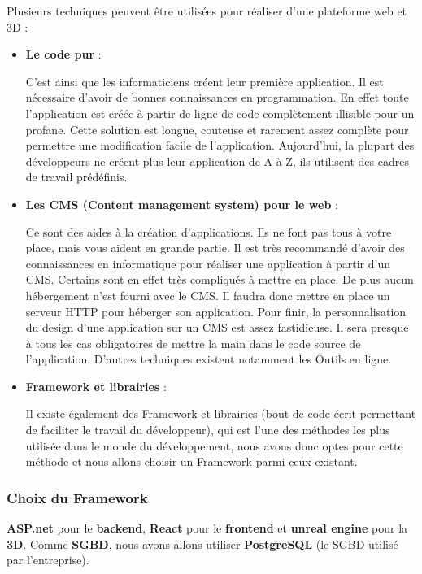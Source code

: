 Plusieurs techniques peuvent être utilisées pour réaliser d’une plateforme web et 3D :

\begin{itemize}
	\item \textbf{Le code pur} :

	      C’est ainsi que les informaticiens créent leur première application. 
		  Il est nécessaire d’avoir de bonnes connaissances en programmation. 
		  En effet toute l'application est créée à partir de ligne de code complètement illisible pour un profane. 
		  Cette solution est longue, couteuse et rarement assez complète pour permettre une modification facile de l’application. 
		  Aujourd’hui, la plupart des développeurs ne créent plus leur application de A à Z, ils utilisent des cadres de travail prédéfinis.

	\item \textbf{Les CMS (Content management system) pour le web} :

	      Ce sont des aides à la création d’applications. Ils ne font pas tous à votre place, mais vous aident en grande partie. Il est très recommandé d’avoir des connaissances en informatique pour réaliser une application à partir d’un CMS. Certains sont en effet très compliqués à mettre en place. De plus aucun hébergement n’est fourni avec le CMS. Il faudra donc mettre en place un serveur HTTP pour héberger son application. Pour finir, la personnalisation du design d’une application sur un CMS est assez fastidieuse. Il sera presque à tous les cas obligatoires de mettre la main dans le code source de   l’application. D’autres techniques existent notamment les Outils en ligne.

	\item \textbf{Framework et librairies} :

	      Il existe également des Framework et librairies (bout de code écrit permettant de faciliter le travail du développeur), qui est l’une des méthodes les plus utilisée dans le monde du développement, nous avons donc optes pour cette méthode et nous allons choisir un Framework parmi ceux existant.
\end{itemize}

\subsubsection{Choix du Framework}

\textbf{ASP.net} pour le \textbf{backend}, \textbf{React} pour le \textbf{frontend} et \textbf{unreal engine} pour la \textbf{3D}. Comme \textbf{SGBD}, nous avons allons utiliser \textbf{PostgreSQL} (le SGBD utilisé par l’entreprise).


